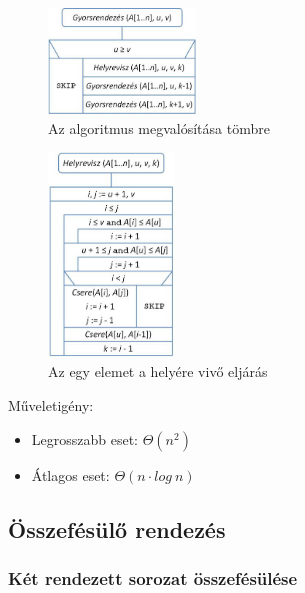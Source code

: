 \documentclass[12pt,margin=0px]{article}
\begin{document}
	\begin{figure}[H]
		\centering
		\includegraphics[width=0.35\textwidth]{img/quicksort.png}
		\caption{Az algoritmus megvalósítása tömbre}
	\end{figure}
	\begin{figure}[H]
		\centering
		\includegraphics[width=0.3\textwidth]{img/quicksort_move.png}
		\caption{Az egy elemet a helyére vivő eljárás}
	\end{figure}
	
    \noindent Műveletigény:
    \begin{itemize}
        \item Legrosszabb eset: $\Theta(n^2)$
        \item Átlagos eset: $\Theta(n \cdot log\ n)$
    \end{itemize}

	\subsection*{Összefésülő rendezés}
	
    \subsubsection*{Két rendezett sorozat összefésülése}
\end{document}
